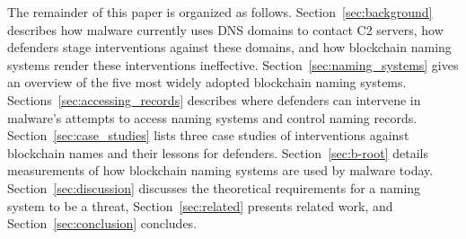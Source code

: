 The remainder of this paper is organized as follows. 
Section~\ref{sec:background} describes how malware currently 
uses DNS domains to contact C2 servers, how defenders 
stage interventions against these domains, and how blockchain 
naming systems render these interventions ineffective. 
Section~\ref{sec:naming_systems} gives an overview of the 
five most widely adopted blockchain naming systems. 
Sections~\ref{sec:accessing_records} describes where defenders 
can intervene in malware's attempts to access naming systems 
and control naming records. Section~\ref{sec:case_studies} 
lists three case studies of interventions against blockchain names and their 
lessons for defenders. Section~\ref{sec:b-root} details 
measurements of how blockchain naming systems are used by 
malware today. Section~\ref{sec:discussion} discusses the 
theoretical requirements for a naming system to be a threat, 
Section~\ref{sec:related} presents related work, and 
Section~\ref{sec:conclusion} concludes.